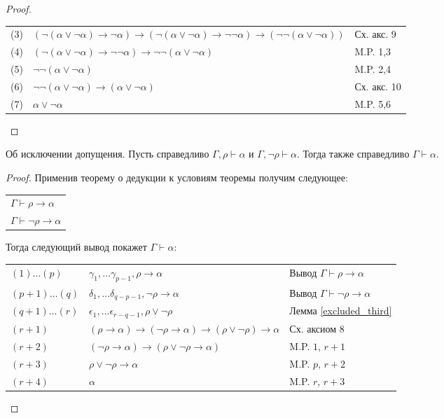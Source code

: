 \begin{proof}
\begin{enumerate}
\begin{tabular}{lll}
(3) & $(\neg(\alpha\vee\neg\alpha) \rightarrow \neg\alpha) \rightarrow (\neg(\alpha\vee\neg\alpha) \rightarrow \neg\neg\alpha) \rightarrow (\neg\neg(\alpha\vee\neg\alpha))$ & Сх. акс. 9\\
(4) & $(\neg(\alpha\vee\neg\alpha) \rightarrow \neg\neg\alpha) \rightarrow \neg\neg(\alpha\vee\neg\alpha)$ & M.P. 1,3\\
(5) & $\neg\neg(\alpha\vee\neg\alpha)$ & M.P. 2,4\\
(6) & $\neg\neg(\alpha\vee\neg\alpha) \rightarrow (\alpha\vee\neg\alpha)$ & Сх. акс. 10\\
(7) & $\alpha\vee\neg\alpha$ & M.P. 5,6
\end{tabular}
\end{enumerate}

\end{proof}

\begin{lemma}{Об исключении допущения.}
Пусть справедливо $\Gamma, \rho \vdash \alpha$ и $\Gamma, \neg \rho \vdash \alpha$.
Тогда также справедливо $\Gamma \vdash \alpha$.
\end{lemma}

\begin{proof}

Применив теорему о дедукции к условиям теоремы получим следующее:

\begin{tabular}{l}
$\Gamma \vdash \rho \rightarrow \alpha$\\
$\Gamma \vdash \neg \rho \rightarrow \alpha$
\end{tabular}

Тогда следующий вывод покажет $\Gamma \vdash \alpha$:

\begin{tabular}{lll}
$(1) \dots (p)$ & $\gamma_1, \dots \gamma_{p-1}, \rho \rightarrow \alpha$ & Вывод $\Gamma \vdash \rho \rightarrow \alpha$\\
$(p+1) \dots (q)$ & $\delta_1, \dots \delta_{q-p-1}, \neg \rho \rightarrow \alpha$ & Вывод $\Gamma \vdash \neg \rho \rightarrow \alpha$\\
$(q+1) \dots (r)$ & $\epsilon_1, \dots \epsilon_{r-q-1}, \rho \vee \neg \rho$ & Лемма \ref{excluded_third}\\
$(r+1)$ & $(\rho \rightarrow \alpha) \rightarrow (\neg \rho \rightarrow \alpha) \rightarrow (\rho \vee \neg \rho) \rightarrow \alpha$ & Сх. аксиом 8\\
$(r+2)$ & $(\neg \rho \rightarrow \alpha) \rightarrow (\rho \vee \neg \rho \rightarrow \alpha)$ & M.P. $1$, $r+1$\\
$(r+3)$ & $\rho \vee \neg \rho \rightarrow \alpha$ & M.P. $p$, $r+2$\\
$(r+4)$ & $\alpha$ & M.P. $r$, $r+3$
\end{tabular}

\end{proof}

